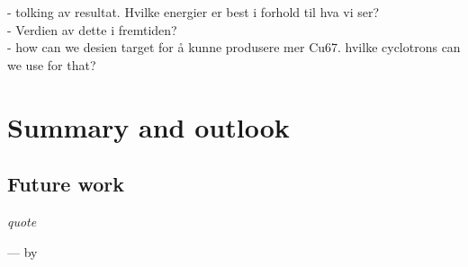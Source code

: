 \documentclass[twoside,english]{uiofysmaster/uiofysmaster}
\begin{document}
- tolking av resultat. Hvilke energier er best i forhold til hva vi ser?\\
- Verdien av dette i fremtiden?\\
- how can we  desien target for å kunne produsere mer Cu67. hvilke cyclotrons can we use for that? 








\chapter{Summary and outlook}
\label{sum_and_outlook}

\section{Future work}
\label{sec: future_work}


\epigraph{\itshape quote}{--- \textup by }








%

%


\end{document}
